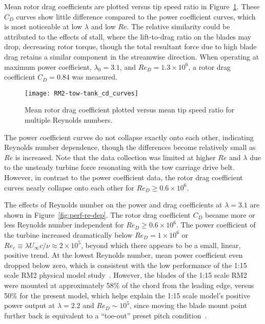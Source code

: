 Mean rotor drag coefficients are plotted versus tip speed ratio in
Figure~\ref{fig:cd-curves}. These $C_D$ curves show little difference compared to
the power coefficient curves, which is most noticeable at low $\lambda$ and low
$Re$. The relative similarity could be attributed to the effects of stall, where
the lift-to-drag ratio on the blades may drop, decreasing rotor torque, though
the total resultant force due to high blade drag retains a similar component in
the streamwise direction. When operating at maximum power coefficient,
$\lambda_0=3.1$, and $Re_D=1.3 \times 10^6$, a rotor drag coefficient $C_D=0.84$
was measured.

\begin{figure}
    \centering

    \texttt{[image: RM2-tow-tank\_cd\_curves]}
    
    \caption{Mean rotor drag coefficient plotted versus mean tip speed ratio for
        multiple Reynolds numbers.}
    
    \label{fig:cd-curves}
\end{figure}

The power coefficient curves do not collapse exactly onto each other, indicating
Reynolds number dependence, though the differences become relatively small as
$Re$ is increased. Note that the data collection was limited at higher $Re$ and
$\lambda$ due to the unsteady turbine force resonating with the tow carriage
drive belt. However, in contrast to the power coefficient data, the rotor drag
coefficient curves nearly collapse onto each other for $Re_D \ge 0.6 \times
10^6$.

The effects of Reynolds number on the power and drag coefficients at
$\lambda=3.1$ are shown in Figure~\ref{fig:perf-re-dep}. The rotor drag
coefficient $C_D$ became more or less Reynolds number independent for $Re_D \ge
0.6 \times 10^6$. The power coefficient of the turbine increased dramatically
below $Re_D = 1 \times 10^6$ or $Re_c \equiv \lambda U_\infty c / \nu \approx 2
\times 10^5$, beyond which there appears to be a small, linear, positive trend.
At the lowest Reynolds number, mean power coefficient even dropped below zero,
which is consistent with the low performance of the 1:15 scale RM2 physical
model study~\cite{Hill2014}. However, the blades of the 1:15 scale RM2 were
mounted at approximately 58\% of the chord from the leading edge, versus 50\%
for the present model, which helps explain the 1:15 scale model's positive power
output at $\lambda=2.2$ and $Re_D \sim 10^5$, since moving the blade mount point
further back is equivalent to a ``toe-out'' preset pitch
condition~\cite{Fiedler2009}.

